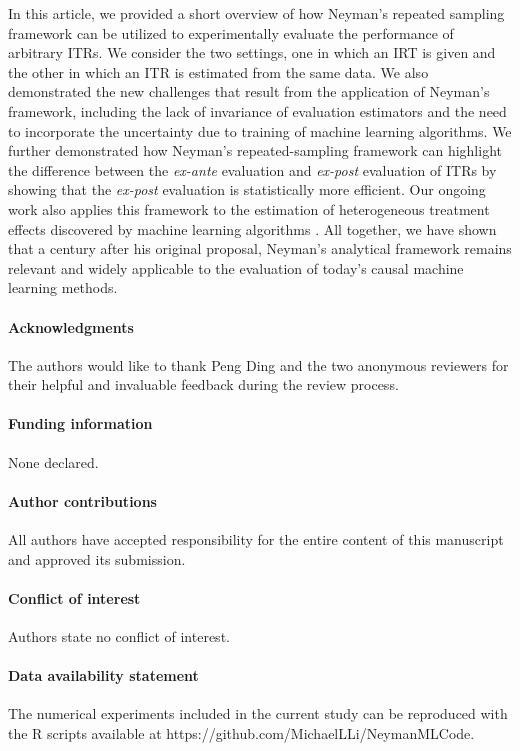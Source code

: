 \documentclass[USenglish,onecolumn]{article}
\begin{document}
In this article, we provided a short overview of how Neyman's repeated
sampling framework can be utilized to experimentally evaluate the
performance of arbitrary ITRs.  We consider the two settings, one in
which an IRT is given and the other in which an ITR is estimated from
the same data.  We also demonstrated the new challenges that result
from the application of Neyman's framework, including the lack of
invariance of evaluation estimators and the need to incorporate the
uncertainty due to training of machine learning algorithms. We further
demonstrated how Neyman's repeated-sampling framework can highlight
the difference between the \emph{ex-ante} evaluation and
\emph{ex-post} evaluation of ITRs by showing that the \emph{ex-post}
evaluation is statistically more efficient.  Our ongoing work also
applies this framework to the estimation of heterogeneous treatment
effects discovered by machine learning algorithms
\citep{imai2023hetero}.  All together, we have shown that a century
after his original proposal, Neyman's analytical framework remains
relevant and widely applicable to the evaluation of today's causal
machine learning methods.

\paragraph*{Acknowledgments} The authors would like to thank Peng Ding and the two anonymous reviewers for their helpful and invaluable feedback during the review process. 
\paragraph*{Funding information}
None declared.
\paragraph*{Author contributions}
All authors have accepted responsibility for the entire content of this manuscript and approved its submission.
\paragraph*{Conflict of interest}
Authors state no conflict of interest.
\paragraph*{Data availability statement}
The numerical experiments included in the current study can be reproduced with the R scripts available at https://github.com/MichaelLLi/NeymanMLCode.
\end{document}
